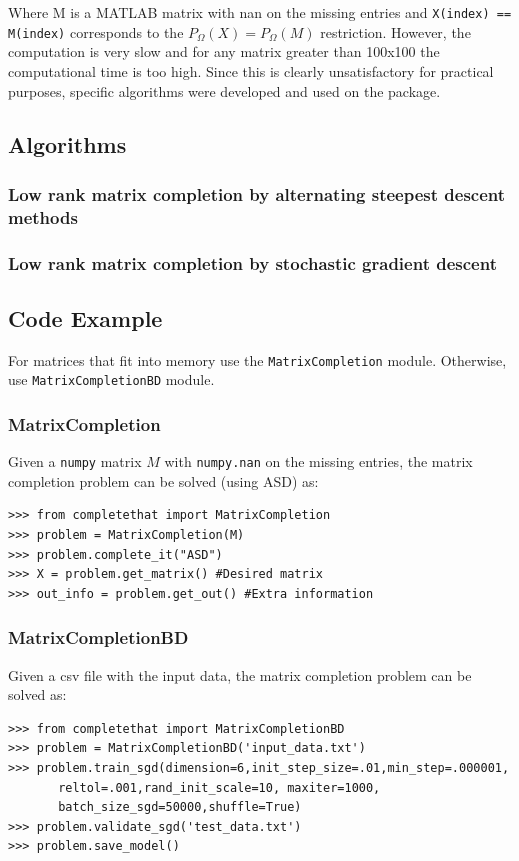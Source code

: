 \documentclass[12pt]{article}
\begin{document}
Where M is a MATLAB matrix with nan on the missing entries and \texttt{X(index) == M(index)} corresponds to the $P_{\Omega}(X) = P_{\Omega}(M)$ restriction. However, the computation is very slow and for any matrix greater than 100x100 the computational time is too high. Since this is clearly unsatisfactory for practical purposes, specific algorithms were developed and used on the package. 

\subsection*{Algorithms}
\subsubsection*{Low rank matrix completion by alternating steepest descent methods}
\subsubsection*{Low rank matrix completion by stochastic gradient descent}

\subsection*{Code Example}
For matrices that fit into memory use the \texttt{MatrixCompletion} module. Otherwise, use \texttt{MatrixCompletionBD} module. 

\subsubsection*{MatrixCompletion}
Given a \texttt{numpy} matrix $M$ with \texttt{numpy.nan} on the missing entries, the matrix completion problem can be solved (using ASD) as:
\begin{verbatim}
>>> from completethat import MatrixCompletion
>>> problem = MatrixCompletion(M)
>>> problem.complete_it("ASD")
>>> X = problem.get_matrix() #Desired matrix
>>> out_info = problem.get_out() #Extra information
\end{verbatim}

\subsubsection*{MatrixCompletionBD}
Given a csv file with the input data, the matrix completion problem can be solved as:

\begin{verbatim}
>>> from completethat import MatrixCompletionBD
>>> problem = MatrixCompletionBD('input_data.txt')
>>> problem.train_sgd(dimension=6,init_step_size=.01,min_step=.000001, 
       reltol=.001,rand_init_scale=10, maxiter=1000,
       batch_size_sgd=50000,shuffle=True)
>>> problem.validate_sgd('test_data.txt')
>>> problem.save_model()
\end{verbatim}
\end{document}

